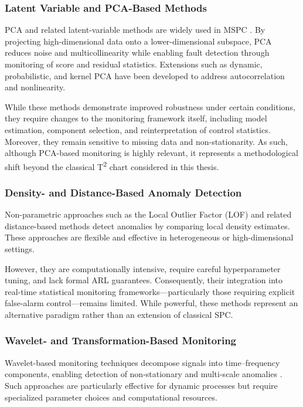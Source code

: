 \subsubsection{Latent Variable and \ac{PCA}-Based Methods}
\ac{PCA} and related latent-variable methods are widely used in MSPC \cite{Jolliffe2002, Kourti2005}. By projecting high-dimensional data onto a lower-dimensional subspace, PCA reduces noise and multicollinearity while enabling fault detection through monitoring of score and residual statistics. Extensions such as dynamic, probabilistic, and kernel PCA have been developed to address autocorrelation and nonlinearity.

While these methods demonstrate improved robustness under certain conditions, they require changes to the monitoring framework itself, including model estimation, component selection, and reinterpretation of control statistics. Moreover, they remain sensitive to missing data and non-stationarity. As such, although PCA-based monitoring is highly relevant, it represents a methodological shift beyond the classical T\textsuperscript{2} chart considered in this thesis.

\subsubsection{Density- and Distance-Based Anomaly Detection}
Non-parametric approaches such as the Local Outlier Factor (\ac{LOF}) \cite{Breunig2000} and related distance-based methods detect anomalies by comparing local density estimates. These approaches are flexible and effective in heterogeneous or high-dimensional settings.

However, they are computationally intensive, require careful hyperparameter tuning, and lack formal \ac{ARL} guarantees. Consequently, their integration into real-time statistical monitoring frameworks—particularly those requiring explicit false-alarm control—remains limited. While powerful, these methods represent an alternative paradigm rather than an extension of classical SPC.

\subsubsection{Wavelet- and Transformation-Based Monitoring}
Wavelet-based monitoring techniques decompose signals into time–frequency components, enabling detection of non-stationary and multi-scale anomalies \cite{Cohen2020}. Such approaches are particularly effective for dynamic processes but require specialized parameter choices and computational resources.


